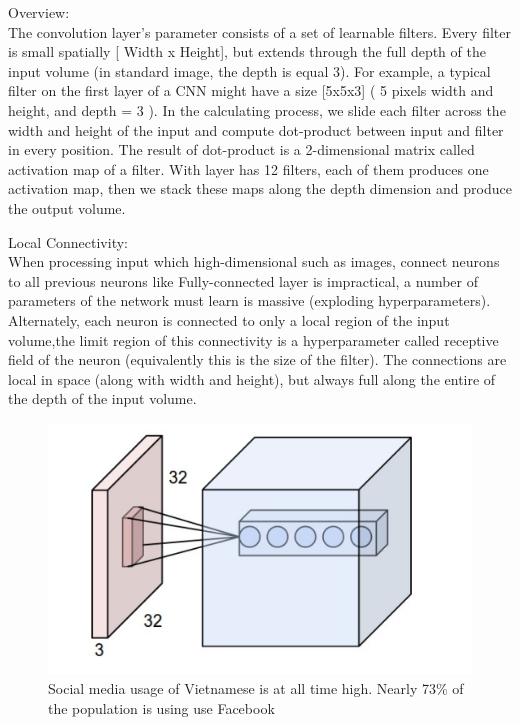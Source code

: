 Overview:\\ 
The convolution layer's parameter consists of a set of learnable filters. Every filter is small spatially [ Width x Height], but extends through the full depth of the input volume (in standard image, the depth is equal 3). For example, a typical filter on the first layer of a CNN might have a size [5x5x3] ( 5 pixels width and height, and depth = 3 ). In the calculating process, we slide each filter across the width and height of the input and compute dot-product between input and filter in every position. The result of dot-product is a 2-dimensional matrix called activation map of a filter. With layer has 12 filters, each of them produces one activation map, then we stack these maps along the depth dimension and produce the output volume.
 
Local Connectivity:\\
When processing input which high-dimensional such as images, connect neurons to all previous neurons like Fully-connected layer is impractical, a number of parameters of the network must learn is massive (exploding hyperparameters). Alternately, each neuron is connected to only a local region of the input volume,the limit region of this connectivity is a hyperparameter called receptive field of the neuron (equivalently this is the size of the filter). The connections are local in space (along with width and height), but always full along the entire of the depth of the input volume.
\begin{center}
  \begin{figure}[H]
  \centering
  \includegraphics[width=1\columnwidth]{images/chap2/LocalConnectivity.png}
  \caption{Social media usage of Vietnamese is at all time high. Nearly 73\% of the population is using use Facebook}
  \label{chap2:LocalConnectivity}
  \end{figure}
\end{center}

